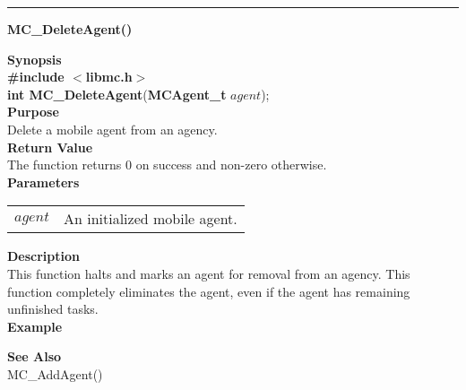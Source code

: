 \noindent
\vspace{5pt}
\rule{6.5in}{0.015in}
\noindent
{}
{\LARGE \bf MC\_DeleteAgent()}\\
\label{api:MC_DeleteAgent()}

\noindent
{\bf Synopsis}\\
{\bf \#include $<$libmc.h$>$}\\
{\bf int MC\_DeleteAgent}({\bf MCAgent\_t} $agent$);\\

\noindent
{\bf Purpose}\\
Delete a mobile agent from an agency.\\

\noindent
{\bf Return Value}\\
The function returns 0 on success and non-zero otherwise.\\

\noindent
{\bf Parameters}
\vspace{-0.1in}
\begin{description}
\item
\begin{tabular}{p{10 mm}p{145 mm}} 
$agent$ & An initialized mobile agent.
\end{tabular}
\end{description}

\noindent
{\bf Description}\\
This function halts and marks an agent for removal from an agency. This 
function completely eliminates the agent, even if the agent has remaining
unfinished tasks. \\

\noindent
{\bf Example}\\
\noindent

\noindent
{\bf See Also}\\
MC\_AddAgent()


